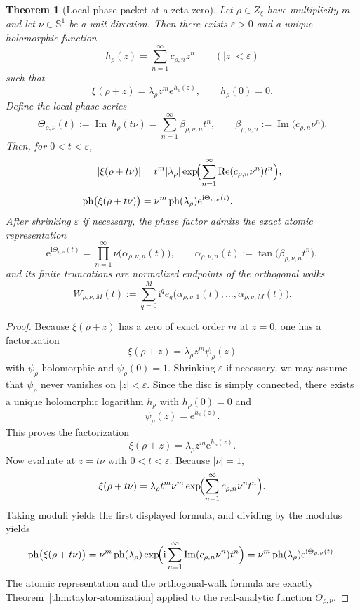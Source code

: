 \documentclass[11pt]{amsart}
\numberwithin{equation}{section}
\newtheorem{theorem}{Theorem}[section]
\theoremstyle{definition}
\theoremstyle{remark}
\DeclareMathOperator{\Rea}{Re}
\DeclareMathOperator{\Ima}{Im}
\newcommand{\Sph}{\mathbb S^1}
\newcommand{\ph}{\operatorname{ph}}
\newcommand{\e}{\mathrm e}
\newcommand{\ii}{\mathrm i}
\begin{document}
\begin{theorem}[Local phase packet at a zeta zero]\label{thm:local-phase-packet}
Let $\rho\in Z_\xi$ have multiplicity $m$, and let $\nu\in\Sph$ be a unit direction.  Then there exists $\varepsilon>0$ and a unique holomorphic function
\[
h_\rho(z)=\sum_{n=1}^{\infty} c_{\rho,n} z^n
\qquad (|z|<\varepsilon)
\]
such that
\[
\xi(\rho+z)=\lambda_\rho z^m \e^{h_\rho(z)},
\qquad h_\rho(0)=0.
\]
Define the local phase series
\[
\Theta_{\rho,\nu}(t):=\Ima\,h_\rho(t\nu)
=\sum_{n=1}^{\infty}\beta_{\rho,\nu,n} t^n,
\qquad
\beta_{\rho,\nu,n}:=\Ima\bigl(c_{\rho,n}\nu^n\bigr).
\]
Then, for $0<t<\varepsilon$,
\begin{align*}
|\xi(\rho+t\nu)|
&=t^m |\lambda_\rho| \exp\!\Bigl(\sum_{n=1}^{\infty}\Rea(c_{\rho,n}\nu^n)t^n\Bigr),\\[4pt]
\ph\bigl(\xi(\rho+t\nu)\bigr)
&=\nu^m\ph(\lambda_\rho)\e^{\ii\Theta_{\rho,\nu}(t)}.
\end{align*}
After shrinking $\varepsilon$ if necessary, the phase factor admits the exact atomic representation
\[
\e^{\ii\Theta_{\rho,\nu}(t)}
=\prod_{n=1}^{\infty}\nu\bigl(\alpha_{\rho,\nu,n}(t)\bigr),
\qquad
\alpha_{\rho,\nu,n}(t):=\tan\bigl(\beta_{\rho,\nu,n}t^n\bigr),
\]
and its finite truncations are normalized endpoints of the orthogonal walks
\[
W_{\rho,\nu,M}(t):=
\sum_{q=0}^M \ii^q e_q\bigl(\alpha_{\rho,\nu,1}(t),\dots,\alpha_{\rho,\nu,M}(t)\bigr).
\]
\end{theorem}

\begin{proof}
Because $\xi(\rho+z)$ has a zero of exact order $m$ at $z=0$, one has a factorization
\[
\xi(\rho+z)=\lambda_\rho z^m \psi_\rho(z)
\]
with $\psi_\rho$ holomorphic and $\psi_\rho(0)=1$.  Shrinking $\varepsilon$ if necessary, we may assume that $\psi_\rho$ never vanishes on $|z|<\varepsilon$.  Since the disc is simply connected, there exists a unique holomorphic logarithm $h_\rho$ with $h_\rho(0)=0$ and
\[
\psi_\rho(z)=\e^{h_\rho(z)}.
\]
This proves the factorization
\[
\xi(\rho+z)=\lambda_\rho z^m \e^{h_\rho(z)}.
\]
Now evaluate at $z=t\nu$ with $0<t<\varepsilon$.  Because $|\nu|=1$,
\[
\xi(\rho+t\nu)=\lambda_\rho t^m \nu^m \exp\!\Bigl(\sum_{n=1}^{\infty} c_{\rho,n}\nu^n t^n\Bigr).
\]
Taking moduli yields the first displayed formula, and dividing by the modulus yields
\[
\ph\bigl(\xi(\rho+t\nu)\bigr)=\nu^m\ph(\lambda_\rho)\exp\!\Bigl(\ii\sum_{n=1}^{\infty}\Ima(c_{\rho,n}\nu^n)t^n\Bigr)
=\nu^m\ph(\lambda_\rho)\e^{\ii\Theta_{\rho,\nu}(t)}.
\]
The atomic representation and the orthogonal-walk formula are exactly Theorem~\ref{thm:taylor-atomization} applied to the real-analytic function $\Theta_{\rho,\nu}$.
\end{proof}
\end{document}
